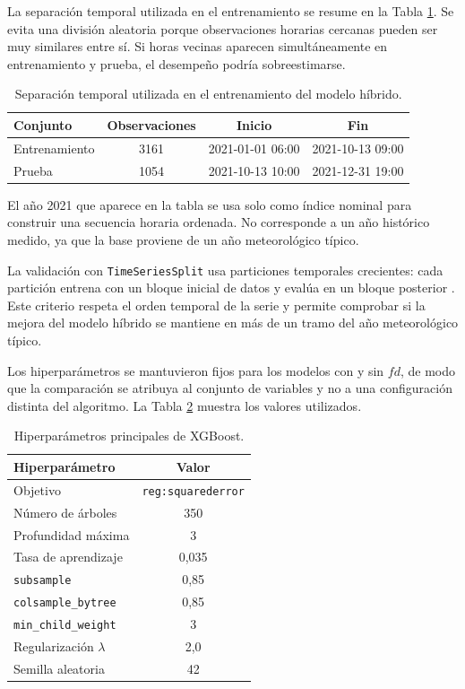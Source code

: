 \documentclass[12pt, letterpaper]{article}
\begin{document}
La separaci\'on temporal utilizada en el entrenamiento se resume en la Tabla \ref{tab:split_temporal}. Se evita una divisi\'on aleatoria porque observaciones horarias cercanas pueden ser muy similares entre s\'i. Si horas vecinas aparecen simult\'aneamente en entrenamiento y prueba, el desempe\~no podr\'ia sobreestimarse.

\begin{table}[H]
\centering
\caption{Separaci\'on temporal utilizada en el entrenamiento del modelo h\'ibrido.}
\label{tab:split_temporal}
\begin{tabular}{lccc}
\toprule
\textbf{Conjunto} & \textbf{Observaciones} & \textbf{Inicio} & \textbf{Fin} \\
\midrule
Entrenamiento & 3161 & 2021-01-01 06:00 & 2021-10-13 09:00 \\
Prueba & 1054 & 2021-10-13 10:00 & 2021-12-31 19:00 \\
\bottomrule
\end{tabular}
\end{table}

El a\~no 2021 que aparece en la tabla se usa solo como \'indice nominal para construir una secuencia horaria ordenada. No corresponde a un a\~no hist\'orico medido, ya que la base proviene de un a\~no meteorol\'ogico t\'ipico.

La validaci\'on con \texttt{TimeSeriesSplit} usa particiones temporales crecientes: cada partici\'on entrena con un bloque inicial de datos y eval\'ua en un bloque posterior . Este criterio respeta el orden temporal de la serie y permite comprobar si la mejora del modelo h\'ibrido se mantiene en m\'as de un tramo del a\~no meteorol\'ogico t\'ipico.

Los hiperpar\'ametros se mantuvieron fijos para los modelos con y sin \(fd\), de modo que la comparaci\'on se atribuya al conjunto de variables y no a una configuraci\'on distinta del algoritmo. La Tabla \ref{tab:hiperparametros_xgb} muestra los valores utilizados.

\begin{table}[H]
\centering
\caption{Hiperpar\'ametros principales de XGBoost.}
\label{tab:hiperparametros_xgb}
\begin{tabular}{lc}
\toprule
\textbf{Hiperpar\'ametro} & \textbf{Valor} \\
\midrule
Objetivo & \texttt{reg:squarederror} \\
N\'umero de \'arboles & 350 \\
Profundidad m\'axima & 3 \\
Tasa de aprendizaje & 0,035 \\
\texttt{subsample} & 0,85 \\
\texttt{colsample\_bytree} & 0,85 \\
\texttt{min\_child\_weight} & 3 \\
Regularizaci\'on \(\lambda\) & 2,0 \\
Semilla aleatoria & 42 \\
\bottomrule
\end{tabular}
\end{table}
\end{document}
